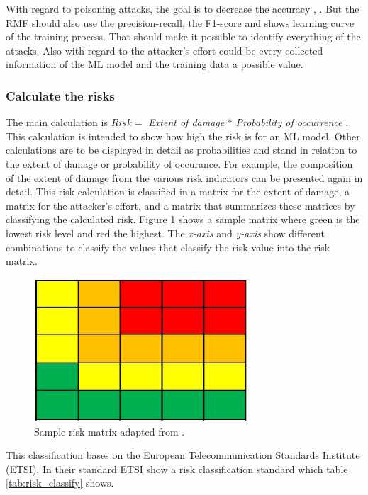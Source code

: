 With regard to poisoning attacks, the goal is to decrease the accuracy \cite{DBLP:conf/icml/BiggioNL12}, \cite{DBLP:journals/corr/abs-1708-06733}. But the RMF should also use the precision-recall, the F1-score and shows learning curve of the training process. That should make it possible to identify everything of the attacks. Also with regard to the attacker's effort could be every collected information of the ML model and the training data a possible value.

\subsubsection*{Calculate the risks}

The main calculation is $Risk = $ \textit{Extent of damage} $*$ \textit{Probability of occurrence} \cite{DBLP:journals/access/JianxingHSH21}. This calculation is intended to show how high the risk is for an ML model. Other calculations are to be displayed in detail as probabilities and stand in relation to the extent of damage or probability of occurance. For example, the composition of the extent of damage from the various risk indicators can be presented again in detail. This risk calculation is classified in a matrix for the extent of damage, a matrix for the attacker's effort, and a matrix that summarizes these matrices by classifying the calculated risk. Figure \ref{fig:sample_matrix} shows a sample matrix where green is the lowest risk level and red the highest. The \textit{x-axis} and \textit{y-axis} show different combinations to classify the values that classify the risk value into the risk matrix.

\begin{figure}[ht!]
  \centering
  \includegraphics[width=8cm]{pictures/sample_matrix.jpg}
  \caption{Sample risk matrix adapted from \cite{Ivanenko2020IMPLEMENTATIONOR}.}
  \label{fig:sample_matrix}
\end{figure}

This classification bases on the European Telecommunication Standards Institute (ETSI). In their standard \cite{applications_2022} ETSI show a risk classification standard which table \ref{tab:risk_classify} shows.

